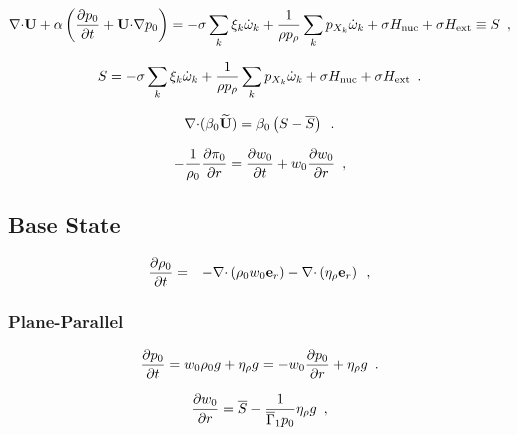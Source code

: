 \documentclass[11pt]{article}
\newcommand{\rhozero}{\rho_0}
\newcommand{\pizero}{\pi_0}
\newcommand{\gammabar}{\overline{\Gamma}_1}
\newcommand{\nablab}{\mathbf{\nabla}}
\newcommand{\cdotb}{\mathbf{\cdot}}
\newcommand{\Hext}{{H_{\rm ext}}}
\newcommand{\Hnuc}{{H_{\rm nuc}}}
\newcommand{\Sbar}{\overline{S}}
\newcommand{\etarho}{\eta_{\rho}}
\newcommand{\ubold}{\mathbf{U}}
\newcommand{\ut}{\widetilde{\ubold}}
\newcommand{\omegadot}{\dot{\omega}}
\newcommand{\er}{\mathbf{e}_r}
\begin{document}
\begin{equation}
\label{eq:constraint}
\nablab \cdotb \ubold + \alpha \left( \frac{\partial p_0}{\partial t} + \ubold \cdotb \nablab p_0 \right) =
 -\sigma  \sum_k \xi_k \omegadot_k  + 
  \frac{1}{\rho p_\rho} \sum_k p_{X_k}  {\omegadot}_k + \sigma \Hnuc + \sigma \Hext \equiv S \enskip ,
\end{equation}

\begin{equation}
  S =  -\sigma  \sum_k  \xi_k \omegadot_k  + 
  \frac{1}{\rho p_\rho} \sum_k p_{X_k}  {\omegadot}_k  + \sigma \Hnuc + \sigma \Hext \enskip .
\label{eq:defineS} 
\end{equation}

\begin{equation}
\nablab \cdotb (\beta_0 \ut )  = \beta_0 \left(S - \Sbar \right )
 \enskip .  \label{eq:tildeconstraint}
\end{equation}

\begin{equation}
- \frac{1}{\rho_0} \frac{\partial \pizero}{\partial r} = \frac{\partial w_0}{\partial t} + w_0 \frac{\partial w_0}{\partial r} \enskip, \label{eq:pizero}
\end{equation}



\subsection{Base State}

\begin{eqnarray}
\frac{\partial \rhozero}{\partial t} &=& - \nablab \cdotb \left( \rhozero w_0 \er \right)
- \nablab \cdotb \left( \etarho \er \right) \enskip ,
\label{eq:rho0upd_new}
\end{eqnarray}

\subsubsection{Plane-Parallel}
\begin{equation}
\frac{\partial p_0}{\partial t} = w_0 \rho_0 g  + \etarho g
                                 = - w_0 \frac{\partial p_0}{\partial r} + \etarho g \enskip .
\label{eq:p0upd_new} 
\end{equation}

\begin{equation}
\frac{\partial w_0}{\partial r} =  \Sbar - \frac{1}{\gammabar p_0} \etarho g \enskip \label{eq:divw0} ,
\end{equation}
\end{document}
